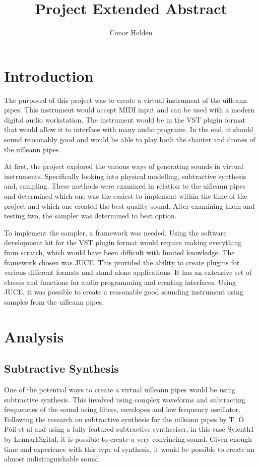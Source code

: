 \documentclass[12pt]{article}
\title{Project Extended Abstract}
\author{Conor Holden }
\begin{document}
	
	\maketitle
		
\section{Introduction}

	The purposed of this project was to create a virtual instrument of the uilleann pipes. This instrument would accept MIDI input and can be used with a modern digital audio workstation. The instrument would be in the VST plugin format that would allow it to 
	interface with many audio programs. In the end, it should sound reasonably good and would be able to play both the chanter 
	and drones of the uilleann pipes.
	
	At first, the project explored the various ways of generating sounds in virtual instruments. Specifically looking into physical modelling, subtractive synthesis and, sampling. These methods were examined in relation to the uilleann pipes and determined
	which one was the easiest to implement within the time of the project and which one created the best quality sound. After examining
	them and testing two, the sampler was determined to best option.
	
	To implement the sampler, a framework was needed. Using the software development kit for the VST plugin format would require
	making everything from scratch, which would have been difficult with limited knowledge. The framework chosen was
	JUCE. This provided the ability to create plugins for various different formats and stand-alone applications. It has an
	extensive set of classes and functions for audio programming and creating interfaces. Using JUCE, it was possible
	to create a reasonable good sounding instrument using samples from the uilleann pipes.	

\section{Analysis}

	
	\subsection{Subtractive Synthesis}
	
	One of the potential ways to create a virtual uilleann pipes would be using subtractive synthesis. This involved using complex
	waveforms and subtracting frequencies of the sound using filters, envelopes and low frequency oscillator. Following the
	research on subtractive synthesis for the uilleann pipes\cite{uilleannSubtractive} by T. Ó Póil et al and using a fully featured subtractive synthesiser,
	in this case Sylenth1 by LennarDigital, it is possible to create a very convincing sound. Given enough time and experience with
	this type of synthesis, it would be possible to create an almost indistinguishable sound.
	
\end{document}
